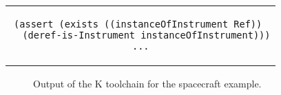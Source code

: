 \hline

\begin{center}
\begin{tabular}{c}
\begin{lstlisting}
(assert (exists ((instanceOfInstrument Ref)) 
  (deref-is-Instrument instanceOfInstrument)))
...
\end{lstlisting}
\end{tabular}
\end{center}

\hline

\begin{figure}
\caption{Output of the K toolchain for the spacecraft example.}
\label{fig:shapes}
\end{figure}

\lstset{language=K}
